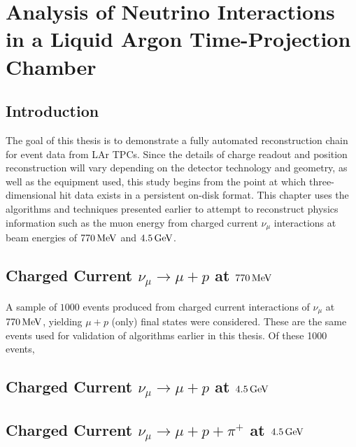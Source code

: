 \chapter{Analysis of Neutrino Interactions in a Liquid Argon Time-Projection Chamber}\label{chapter:Analysis}
\section{Introduction}
The goal of this thesis is to demonstrate a fully automated reconstruction chain for event data from \ac{LAr TPC}s. Since the details of charge readout and position reconstruction will vary depending on the detector technology and geometry, as well as the equipment used, this study begins from the point at which three-dimensional hit data exists in a persistent on-disk format. This chapter uses the algorithms and techniques presented earlier to attempt to reconstruct physics information such as the muon energy from charged current $\nu_\mu$ interactions at beam energies of $770\,\mathrm{MeV}$ and $4.5\,\mathrm{GeV}$.

\section{Charged Current $\nu_\mu \rightarrow \mu + p$ at $770\,\mathrm{MeV}$}
A sample of $1000$ events produced from charged current interactions of $\nu_\mu$ at $770\,\mathrm{MeV}$, yielding $\mu + p$ (only) final states were considered. These are the same events used for validation of algorithms earlier in this thesis. Of these 1000 events, 

\section{Charged Current $\nu_\mu \rightarrow \mu + p$ at $4.5\,\mathrm{GeV}$}

\section{Charged Current $\nu_\mu \rightarrow \mu + p + \pi^+$ at $4.5\,\mathrm{GeV}$}

